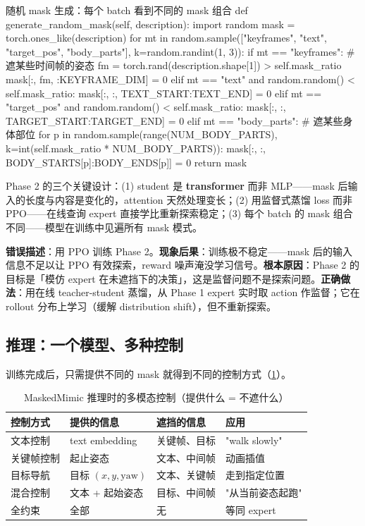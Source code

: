 \begin{codebox}[Python]{随机 mask 生成：每个 batch 看到不同的 mask 组合}
def generate_random_mask(self, description):
    import random
    mask = torch.ones_like(description)
    for mt in random.sample(["keyframes", "text", "target_pos", "body_parts"],
                            k=random.randint(1, 3)):
        if mt == "keyframes":              # 遮某些时间帧的姿态
            fm = torch.rand(description.shape[1]) > self.mask_ratio
            mask[:, fm, :KEYFRAME_DIM] = 0
        elif mt == "text" and random.random() < self.mask_ratio:
            mask[:, :, TEXT_START:TEXT_END] = 0
        elif mt == "target_pos" and random.random() < self.mask_ratio:
            mask[:, :, TARGET_START:TARGET_END] = 0
        elif mt == "body_parts":           # 遮某些身体部位
            for p in random.sample(range(NUM_BODY_PARTS),
                                   k=int(self.mask_ratio * NUM_BODY_PARTS)):
                mask[:, :, BODY_STARTS[p]:BODY_ENDS[p]] = 0
    return mask
\end{codebox}

Phase 2 的三个关键设计：(1) student 是 \textbf{transformer} 而非 MLP——mask 后输入的长度与内容是变化的，attention 天然处理变长；(2) 用监督式蒸馏 loss 而非 PPO——在线查询 expert 直接学比重新探索稳定；(3) 每个 batch 的 mask 组合不同——模型在训练中见遍所有 mask 模式。

\begin{pitfall}
\textbf{错误描述}：用 PPO 训练 Phase 2。\textbf{现象后果}：训练极不稳定——mask 后的输入信息不足以让 PPO 有效探索，reward 噪声淹没学习信号。\textbf{根本原因}：Phase 2 的目标是「模仿 expert 在未遮挡下的决策」，这是监督问题不是探索问题。\textbf{正确做法}：用在线 teacher-student 蒸馏，从 Phase 1 expert 实时取 action 作监督；它在 rollout 分布上学习（缓解 distribution shift），但不重新探索。
\end{pitfall}

\subsection{推理：一个模型、多种控制}
\label{sec:rlmc-mm-masked-infer}

训练完成后，只需提供不同的 mask 就得到不同的控制方式（\cref{tab:rlmc-mm-masked-modes}）。

\begin{table}[ht]
\centering
\small
\caption{MaskedMimic 推理时的多模态控制（提供什么 = 不遮什么）}
\label{tab:rlmc-mm-masked-modes}
\begin{tabular}{@{}llll@{}}
\toprule
控制方式 & 提供的信息 & 遮挡的信息 & 应用 \\
\midrule
文本控制 & text embedding & 关键帧、目标 & "walk slowly" \\
关键帧控制 & 起止姿态 & 文本、中间帧 & 动画插值 \\
目标导航 & 目标 $(x,y,\mathrm{yaw})$ & 文本、关键帧 & 走到指定位置 \\
混合控制 & 文本 + 起始姿态 & 目标、中间帧 & "从当前姿态起跑" \\
全约束 & 全部 & 无 & 等同 expert \\
\bottomrule
\end{tabular}
\end{table}

